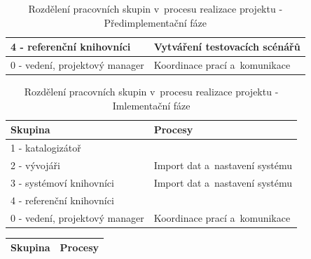 \documentclass[
	11pt, oneside, printed, final, palatino, monochrome
	microtype,
	table,   %
	lof,     %
	lot     %
]{fithesis3}
\newcommand{\bold}[1]{\textbf{#1}}
\begin{document}
{\begin{table}
\begin{tabular}{| p{3cm} | p{8.3cm} |}
	4 - referenční knihovníci
    & 
    Vytváření testovacích scénářů
    \\ \hline
    
	0 - vedení, projektový manager
    & 
    Koordinace prací a~komunikace
    \\ \hline
    
    \end{tabular}
    \caption{Rozdělení pracovních skupin v~procesu realizace projektu - Předimplementační fáze}
\end{table}
    
\begin{table}
    \centering
    \begin{tabular}{| p{3cm} | p{8.3cm} |}
    \hline
    \bold{Skupina} 	
    & 
    \bold{Procesy} 
    \\ \hline
    
	1 - katalogizátoř
    & 
    
    \\ \hline
    
	2 - vývojáři
    & 
    Import dat a~nastavení systému
    \\ \hline
    
	3 - systémoví knihovníci
    & 
    Import dat a~nastavení systému
    \\ \hline
    
	4 - referenční knihovníci
    & 
    
    \\ \hline
    
	0 - vedení, projektový manager
    & 
    Koordinace prací a~komunikace
    \\ \hline
    
    \end{tabular}
    \caption{Rozdělení pracovních skupin v~procesu realizace projektu - Imlementační fáze}
\end{table}

\begin{table}
    \centering
    \begin{tabular}{| p{3cm} | p{8.3cm} |}
    \hline
    \bold{Skupina} 	
    & 
    \bold{Procesy} 
    \\ \hline
    

\end{tabular}
\end{table}}
\end{document}
